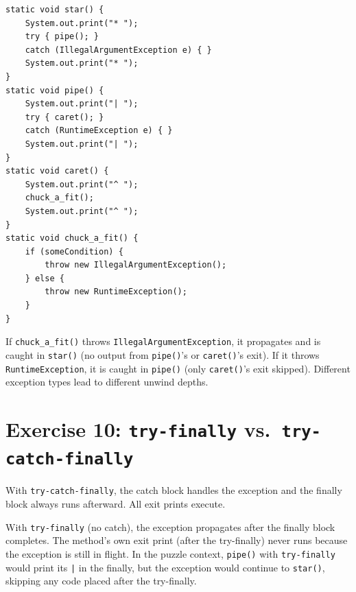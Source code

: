 \documentclass[twoside=false,DIV=14]{scrartcl}
\begin{document}
\begin{lstlisting}
static void star() {
    System.out.print("* ");
    try { pipe(); }
    catch (IllegalArgumentException e) { }
    System.out.print("* ");
}
static void pipe() {
    System.out.print("| ");
    try { caret(); }
    catch (RuntimeException e) { }
    System.out.print("| ");
}
static void caret() {
    System.out.print("^ ");
    chuck_a_fit();
    System.out.print("^ ");
}
static void chuck_a_fit() {
    if (someCondition) {
        throw new IllegalArgumentException();
    } else {
        throw new RuntimeException();
    }
}
\end{lstlisting}

If \texttt{chuck\_a\_fit()} throws \texttt{IllegalArgumentException}, it propagates and is caught in \texttt{star()} (no output from \texttt{pipe()}'s or \texttt{caret()}'s exit).  If it throws \texttt{RuntimeException}, it is caught in \texttt{pipe()} (only \texttt{caret()}'s exit skipped).  Different exception types lead to different unwind depths.

\section*{Exercise 10: \texttt{try-finally} vs.\ \texttt{try-catch-finally}}

With \texttt{try-catch-finally}, the catch block handles the exception and the finally block always runs afterward.  All exit prints execute.

With \texttt{try-finally} (no catch), the exception propagates after the finally block completes.  The method's own exit print (after the try-finally) never runs because the exception is still in flight.  In the puzzle context, \texttt{pipe()} with \texttt{try-finally} would print its \texttt{|} in the finally, but the exception would continue to \texttt{star()}, skipping any code placed after the try-finally.
\end{document}
